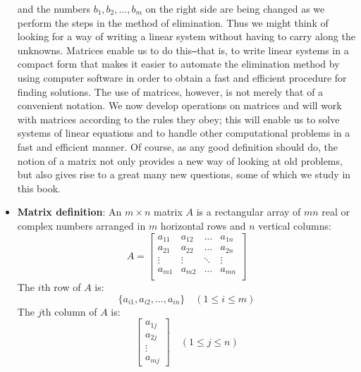 \documentclass{report}
\begin{document}
\begin{itemize}
             and the numbers $b_1, b_2, \ldots, b_m$ on the right side are being changed as we perform 
             the steps in the method of elimination. Thus we might think of looking for a way 
             of writing a linear system without having to carry along the unknowns. Matrices 
             enable us to do this\texttt{--}that is, to write linear systems in a compact form that makes 
             it easier to automate the elimination method by using computer software in order 
             to obtain a fast and efficient procedure for finding solutions. The use of matrices, 
             however, is not merely that of a convenient notation. We now develop operations 
             on matrices and will work with matrices according to the rules they obey; this will 
             enable us to solve systems of linear equations and to handle other computational 
             problems in a fast and efficient manner. Of course, as any good definition should 
             do, the notion of a matrix not only provides a new way of looking at old problems, 
             but also gives rise to a great many new questions, some of which we study in this 
             book.
         \item \textbf{Matrix definition}:
             An $m \times n$ matrix $A$ is a rectangular array of $mn$ real or complex numbers arranged in $m$ horizontal rows and $n$ vertical columns:
             \[
                 A = \begin{bmatrix}
                     a_{11} & a_{12} & \dots & a_{1n} \\
                     a_{21} & a_{22} & \dots & a_{2n} \\
                     \vdots & \vdots & \ddots & \vdots \\
                     a_{m1} & a_{m2} & \dots & a_{mn} \\
                 \end{bmatrix}
             \]
             The $i$th row of $A$ is:
             \[
                 \{a_{i1}, a_{i2}, \dots, a_{in}\} \quad (1 \leq i \leq m)
             \]
             The $j$th column of $A$ is:
             \[
                 \begin{bmatrix}
                     a_{1j} \\
                     a_{2j} \\
                     \vdots \\
                     a_{mj}
                 \end{bmatrix} \quad (1 \leq j \leq n)
\]
\end{itemize}
\end{document}
